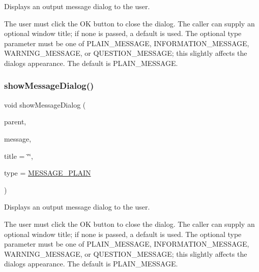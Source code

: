 Displays an output message dialog to the user. 

The user must click the \textquotesingle{}OK\textquotesingle{} button to close the dialog. The caller can supply an optional window title; if none is passed, a default is used. The optional \textquotesingle{}type\textquotesingle{} parameter must be one of P\+L\+A\+I\+N\+\_\+\+M\+E\+S\+S\+A\+GE, I\+N\+F\+O\+R\+M\+A\+T\+I\+O\+N\+\_\+\+M\+E\+S\+S\+A\+GE, W\+A\+R\+N\+I\+N\+G\+\_\+\+M\+E\+S\+S\+A\+GE, or Q\+U\+E\+S\+T\+I\+O\+N\+\_\+\+M\+E\+S\+S\+A\+GE; this slightly affects the dialog\textquotesingle{}s appearance. The default is P\+L\+A\+I\+N\+\_\+\+M\+E\+S\+S\+A\+GE. \mbox{\label{classGOptionPane_ac3ad66eb6ee62ad9140d04e38440e782}} 
\subsubsection{\texorpdfstring{show\+Message\+Dialog()}{showMessageDialog()}\hspace{0.1cm}{\footnotesize\ttfamily [2/3]}}
{\footnotesize\ttfamily void show\+Message\+Dialog (\begin{DoxyParamCaption}\item[{\mbox{\hyperlink{classGWindow}{G\+Window}} $\ast$}]{parent,  }\item[{const std\+::string \&}]{message,  }\item[{const std\+::string \&}]{title = {\ttfamily \char`\"{}\char`\"{}},  }\item[{\mbox{\hyperlink{classGOptionPane_ac6606ebe91c8ac66a2c314c79f5ab013}{Message\+Type}}}]{type = {\ttfamily \mbox{\hyperlink{classGOptionPane_ac6606ebe91c8ac66a2c314c79f5ab013ac03a17c74c589b004d166532958a6196}{M\+E\+S\+S\+A\+G\+E\+\_\+\+P\+L\+A\+IN}}} }\end{DoxyParamCaption})\hspace{0.3cm}{\ttfamily [static]}}



Displays an output message dialog to the user. 

The user must click the \textquotesingle{}OK\textquotesingle{} button to close the dialog. The caller can supply an optional window title; if none is passed, a default is used. The optional \textquotesingle{}type\textquotesingle{} parameter must be one of P\+L\+A\+I\+N\+\_\+\+M\+E\+S\+S\+A\+GE, I\+N\+F\+O\+R\+M\+A\+T\+I\+O\+N\+\_\+\+M\+E\+S\+S\+A\+GE, W\+A\+R\+N\+I\+N\+G\+\_\+\+M\+E\+S\+S\+A\+GE, or Q\+U\+E\+S\+T\+I\+O\+N\+\_\+\+M\+E\+S\+S\+A\+GE; this slightly affects the dialog\textquotesingle{}s appearance. The default is P\+L\+A\+I\+N\+\_\+\+M\+E\+S\+S\+A\+GE. \mbox{\label{classGOptionPane_a2284af6ada78d0ddedfc5c2eaeea2d9b}} 
